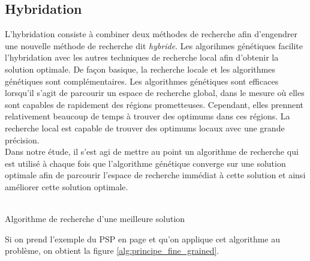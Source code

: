 \documentclass[12pt,a4paper]{article}
\begin{document}
	\subsection{Hybridation}
	L'hybridation consiste à combiner deux méthodes de recherche afin d'engendrer une nouvelle méthode de recherche dit \emph{hybride}. Les algorihmes génétiques facilite l'hybridation avec les autres techniques de recherche local afin d'obtenir la solution optimale. De façon basique, la recherche locale et les algorithmes génétiques sont complémentaires. Les algorithmes génétiques sont efficaces lorsqu'il s'agit de parcourir un espace de recherche global, dans le mesure où elles sont capables de rapidement des régions prometteuses. Cependant, elles prennent relativement beaucoup de temps à trouver des optimums dans ces régions. La recherche local est capable de trouver des optimums locaux avec une grande précision. \\
	\hspace*{.5cm} Dans notre étude, il s'est agi de mettre au point un algorithme de recherche qui est utilisé à chaque fois que l'algorithme génétique converge sur une solution optimale afin de parcourir l'espace de recherche immédiat à cette solution et ainsi améliorer cette solution optimale.  \\
	\\
	\begin{algorithm}[H]
 		\caption{Algorithme de recherche d'une meilleure solution}
 		\BlankLine
	\end{algorithm}
	\vspace*{.5cm}
	Si on prend l'exemple du PSP en page \pageref{sec:problem_description} et qu'on applique cet algorithme au problème, on obtient la figure \ref{alg:principe_fine_grained}.
	
\end{document}
